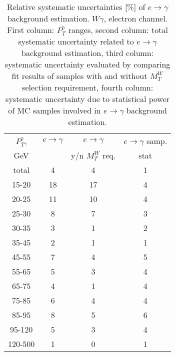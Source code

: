 \begin{table}[h]
  \scriptsize
  \begin{center}
  \caption{Relative systematic uncertainties [\%] of $e\rightarrow\gamma$ background estimation. $W\gamma$, electron channel. First column: $P_T^{\gamma}$ ranges, second column: total systematic uncertainty related to $e\rightarrow\gamma$ background estimation, third column: systematic uncertainty evaluated by comparing fit results of samples with and without $M_T^W$ selection requirement, fourth column: systematic uncertainty due to statistical power of MC samples involved in $e\rightarrow\gamma$ background estimation. }
  \begin{tabular}{|c|c|c|c|}
    $P_T^{\gamma}$,  & $e\rightarrow\gamma$ & $e\rightarrow\gamma$  & $e\rightarrow\gamma$ samp.\\
    GeV  &  & y/n $M_T^W$ req. & stat\\ \hline
    total  & 4 & 4 & 1 \\ \hline
    15-20 & 18 & 17 & 4 \\ \hline
    20-25 & 11 & 10 & 4 \\ \hline
    25-30 & 8 & 7 & 3 \\ \hline
    30-35 & 3 & 1 & 2 \\ \hline
    35-45 & 2 & 1 & 1 \\ \hline
    45-55 & 7 & 4 & 5 \\ \hline
    55-65 & 5 & 3 & 4 \\ \hline
    65-75 & 4 & 1 & 4 \\ \hline
    75-85 & 6 & 4 & 4 \\ \hline
    85-95 & 8 & 5 & 6 \\ \hline
    95-120 & 5 & 3 & 4 \\ \hline
    120-500 & 1 & 0 & 1 \\ \hline
  \end{tabular}
  \label{tab:systInPercentEtogamma_ELECTRON_WGamma}
  \end{center}
\end{table}

